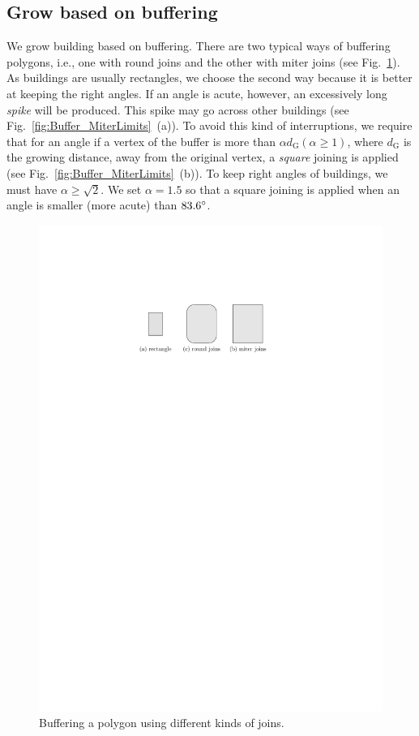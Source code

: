 \documentclass[graybox]{svmult}
\newcommand{\fig}{Fig.~}
\begin{document}
\subsection{Grow based on buffering}
\label{sec:Grow}
We grow building based on buffering. 
There are two typical ways of buffering polygons, i.e.,
one with round joins and the other with miter joins (see 
\fig\ref{fig:Buffer_TwoKinds}).
As buildings are usually rectangles, 
we choose the second way because it is 
better at keeping the right angles.
If an angle is acute, however, an excessively long \emph{spike} will be 
produced.
This spike may go across other buildings 
(see \fig\ref{fig:Buffer_MiterLimits}~(a)).
To avoid this kind of interruptions, 
we require that for an angle if a vertex of the 
buffer is more than $\alpha d_\mathrm{G} (\alpha \ge 1)$, 
where $d_\mathrm{G}$ is the growing distance, 
away from the original vertex, 
a \emph{square} joining is applied
(see \fig\ref{fig:Buffer_MiterLimits}~(b)).
To keep right angles of buildings, 
we must have $\alpha \geq \sqrt{2}$. 
We set $\alpha  = 1.5$ so that a square joining is applied when an angle is 
smaller (more acute) than $83.6 \degree$.

\begin{figure}[tb]
	\centering
	\includegraphics{Buffer_TwoKinds}
	\caption{Buffering a polygon using different kinds of joins.}
	\label{fig:Buffer_TwoKinds}
\end{figure}
\end{document}
